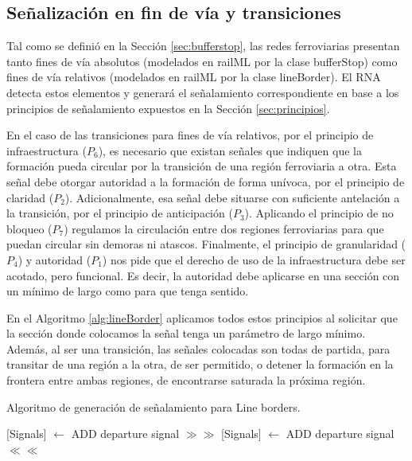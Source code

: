 \subsection{Señalización en fin de vía y transiciones}
    

    Tal como se definió en la Sección \ref{sec:bufferstop}, las redes ferroviarias presentan tanto fines de vía absolutos (modelados en railML por la clase bufferStop) como fines de vía relativos (modelados en railML por la clase lineBorder). El RNA detecta estos elementos y generará el señalamiento correspondiente en base a los principios de señalamiento expuestos en la Sección \ref{sec:principios}.

    En el caso de las transiciones para fines de vía relativos, por el principio de infraestructura ($P_6$), es necesario que existan señales que indiquen que la formación pueda circular por la transición de una región ferroviaria a otra. Esta señal debe otorgar autoridad a la formación de forma unívoca, por el principio de claridad ($P_2$). Adicionalmente, esa señal debe situarse con suficiente antelación a la transición, por el principio de anticipación ($P_3$). Aplicando el principio de no bloqueo ($P_7$) regulamos la circulación entre dos regiones ferroviarias para que puedan circular sin demoras ni atascos. Finalmente, el principio de granularidad ($P_4$) y autoridad ($P_1$) nos pide que el derecho de uso de la infraestructura debe ser acotado, pero funcional. Es decir, la autoridad debe aplicarse en una sección con un mínimo de largo como para que tenga sentido. 

    En el Algoritmo \ref{alg:lineBorder} aplicamos todos estos principios al solicitar que la sección donde colocamos la señal tenga un parámetro de largo mínimo. Además, al ser una transición, las señales colocadas son todas de partida, para transitar de una región a la otra, de ser permitido, o detener la formación en la frontera entre ambas regiones, de encontrarse saturada la próxima región.
    
    \begin{algorithm}[hbt!]
        \caption{Algoritmo de generación de señalamiento para Line borders.}\label{alg:lineBorder}
        \DontPrintSemicolon
        \SetNoFillComment
        \LinesNotNumbered 
        {
            {
                {
                    [Signals] $\gets$ ADD departure signal $\gg\gg$\;
                }
                {
                    [Signals] $\gets$ ADD departure signal $\ll\ll$\;
                }
            }
        }
        \KwResult{[Signals]} 
    \end{algorithm}


